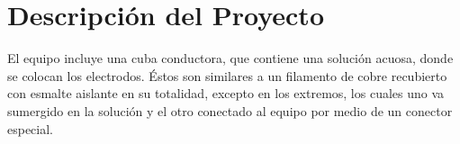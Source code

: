 \section{Descripción del Proyecto}

El equipo incluye una cuba conductora, que contiene una solución acuosa, donde se colocan los electrodos. Éstos son similares a un filamento de cobre recubierto con esmalte aislante en su totalidad, excepto en los extremos, los cuales uno va sumergido en la solución y el otro conectado al equipo por medio de un conector especial.\\


